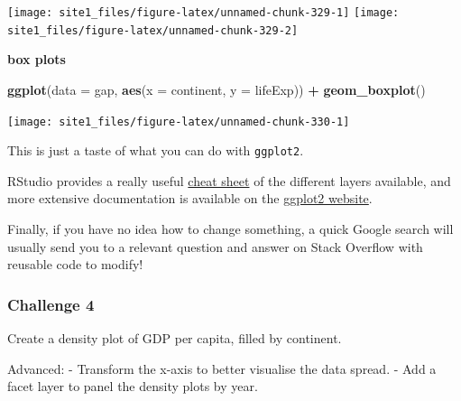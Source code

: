 \documentclass[]{book}
\newenvironment{Shaded}{\begin{snugshade}}{\end{snugshade}}
\newcommand{\KeywordTok}[1]{\textcolor[rgb]{0.13,0.29,0.53}{\textbf{#1}}}
\newcommand{\DataTypeTok}[1]{\textcolor[rgb]{0.13,0.29,0.53}{#1}}
\newcommand{\StringTok}[1]{\textcolor[rgb]{0.31,0.60,0.02}{#1}}
\newcommand{\OperatorTok}[1]{\textcolor[rgb]{0.81,0.36,0.00}{\textbf{#1}}}
\newcommand{\NormalTok}[1]{#1}
\begin{document}
\begin{center}\texttt{[image: site1\_files/figure-latex/unnamed-chunk-329-1]} \texttt{[image: site1\_files/figure-latex/unnamed-chunk-329-2]} \end{center}

\textbf{box plots}

\begin{Shaded}
\begin{Highlighting}[]
\KeywordTok{ggplot}\NormalTok{(}\DataTypeTok{data =}\NormalTok{ gap, }\KeywordTok{aes}\NormalTok{(}\DataTypeTok{x =}\NormalTok{ continent, }\DataTypeTok{y =}\NormalTok{ lifeExp)) }\OperatorTok{+}\StringTok{ }
\StringTok{  }\KeywordTok{geom_boxplot}\NormalTok{()}
\end{Highlighting}
\end{Shaded}

\begin{center}\texttt{[image: site1\_files/figure-latex/unnamed-chunk-330-1]} \end{center}

This is just a taste of what you can do with \texttt{ggplot2}.

RStudio provides a really useful
\href{https://www.rstudio.com/wp-content/uploads/2015/03/ggplot2-cheatsheet.pdf}{cheat
sheet} of the different layers available, and more extensive
documentation is available on the
\href{http://docs.ggplot2.org/current/}{ggplot2 website}.

Finally, if you have no idea how to change something, a quick Google
search will usually send you to a relevant question and answer on Stack
Overflow with reusable code to modify!

\subsubsection*{Challenge 4}\label{challenge-4}

Create a density plot of GDP per capita, filled by continent.

Advanced: - Transform the x-axis to better visualise the data spread. -
Add a facet layer to panel the density plots by year.
\end{document}
